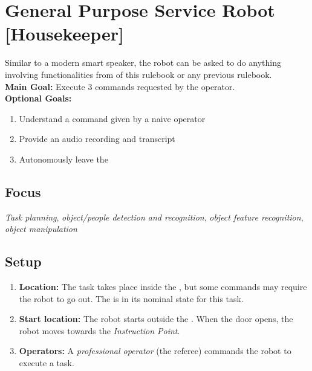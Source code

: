 \section{General Purpose Service Robot [Housekeeper]}
\label{test:gpsr}
Similar to a modern smart speaker, the robot can be asked to do anything involving functionalities from \SONE{} of this rulebook or any previous rulebook.\\

\noindent \textbf{Main Goal:} Execute 3 commands requested by the operator.\\

\noindent \textbf{Optional Goals:}
\begin{enumerate}[nosep]
	\item Understand a command given by a naive operator
	\item Provide an audio recording and transcript
	\item Autonomously leave the \Arena{}
\end{enumerate}

\subsection*{Focus}
\emph{Task planning}, \emph{object/people detection and recognition}, \emph{object feature recognition}, \emph{object manipulation}

%
%
\subsection*{Setup}
\begin{enumerate}[nosep]
	\item \textbf{Location:} The task takes place inside the \Arena{}, but some commands may require the robot to go out. The \Arena{} is in its nominal state for this task.
	\item \textbf{Start location:} The robot starts outside the \Arena{}. When the door opens, the robot moves towards the \textit{Instruction Point}.
	\item \textbf{Operators:} A \emph{professional operator} (the referee) commands the robot to execute a task.
\end{enumerate}


%
%
